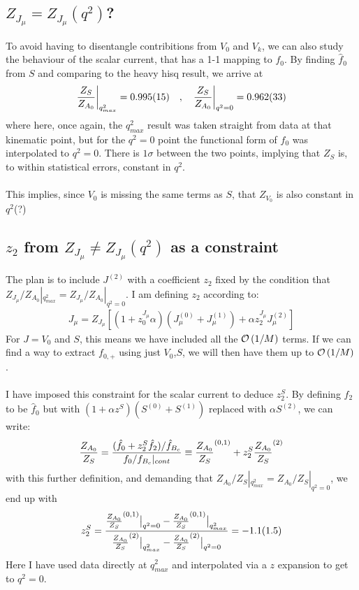 \subsection{$Z_{J_{\mu}} = Z_{J_{\mu}}(q^2)$?}

To avoid having to disentangle contribitions from $V_0$ and $V_k$, we can also study the behaviour of the scalar current, that has a 1-1 mapping to $f_0$. By finding $\hat{f}_0$ from $S$ and comparing to the heavy hisq result, we arrive at
\begin{align}
	{Z_S \over Z_{A_0}}\bigg\vert_{q^2_{max}} = 0.995(15) \quad , \quad {Z_S \over Z_{A_0}}\bigg\vert_{q^2=0} = 0.962(33)
\end{align}
where here, once again, the $q^2_{max}$ result was taken straight from data at that kinematic point, but for the $q^2=0$ point the functional form of $\hat{f}_0$ was interpolated to $q^2=0$. There is $1\sigma$ between the two points, implying that $Z_S$ is, to within statistical errors, constant in $q^2$.
\\ \\
This implies, since $V_0$ is missing the same terms as $S$, that $Z_{V_0}$ is also constant in $q^2$(?)

\subsection{$z_2$ from $Z_{J_{\mu}} \neq Z_{J_{\mu}}(q^2)$ as a constraint}

The plan is to include $J^{(2)}$ with a coefficient $z_2$ fixed by the condition that $Z_{J_{\mu}}/Z_{A_0}|_{q^2_{max}} = Z_{J_{\mu}}/Z_{A_0}|_{q^2=0}$. I am defining $z_2$ according to:
\begin{align}
 J_{\mu} = Z_{J_{\mu}} \left[ (1 + z^{J_{\mu}}_0 \alpha)( J_{\mu}^{(0)} + J_{\mu}^{(1)} ) + \alpha z^{J_{\mu}}_2 J^{(2)}_{\mu} \right]
\end{align}
For $J = V_0 $ and $S$, this means we have included all the $\mathcal{O}\left( 1/M \right)$ terms. If we can find a way to extract $f_{0,+}$ using just $V_0$,$S$, we will then have them up to $\mathcal{O}\left( 1/M \right)$.
\\ \\
I have imposed this constraint for the scalar current to deduce $z^{S}_2$. By defining $\hat{f}_2$ to be $\hat{f}_0$ but with $(1+\alpha z^S)( S^{(0)} + S^{(1)} )$ replaced with $\alpha S^{(2)}$, we can write:
\begin{align}
	{Z_{A_0}\over Z_{S}} = { ( \hat{f}_0 + z^S_2 \hat{f}_2 )/ \hat{f}_{B_c}  \over f_0/f_{B_c}|_{cont} } \equiv {Z_{A_0}\over Z_{S}}^{(0,1)} + z^S_2 {Z_{A_0}\over Z_{S}}^{(2)}
\end{align}
with this further definition, and demanding that ${Z_{A_0}/ Z_{S}}|_{q^2_{max}} = {Z_{A_0}/ Z_{S}}|_{q^2=0}$, we end up with
\begin{align}
	z^S_2 = { {Z_{A_0}\over Z_{S}}^{(0,1)}\big\vert_{q^2=0} - {Z_{A_0}\over Z_{S}}^{(0,1)}\big\vert_{q^2_{max}}
\over {Z_{A_0}\over Z_{S}}^{(2)}\big\vert_{q^2_{max}} - {Z_{A_0}\over Z_{S}}^{(2)}\big\vert_{q^2=0} }
 = -1.1(1.5)
\end{align}
Here I have used data directly at $q^2_{max}$ and interpolated via a $z$ expansion to get to $q^2=0$.

